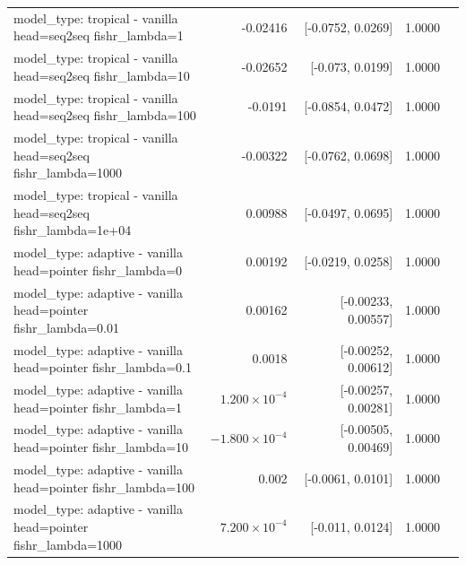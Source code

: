\documentclass[10pt]{article}
\makeatletter
\newcommand{\stackcell}[1]{\begin{tabular}[t]{@{}l@{}}#1\end{tabular}}
\makeatother
\begin{document}
{\begin{longtable}{lrrrl}
\stackcell{model\_type: tropical - vanilla\\\footnotesize head=seq2seq fishr\_lambda=1 } & -0.02416 & [-0.0752, 0.0269] & 1.0000 & \\
\stackcell{model\_type: tropical - vanilla\\\footnotesize head=seq2seq fishr\_lambda=10 } & -0.02652 & [-0.073, 0.0199] & 1.0000 & \\
\stackcell{model\_type: tropical - vanilla\\\footnotesize head=seq2seq fishr\_lambda=100 } & -0.0191 & [-0.0854, 0.0472] & 1.0000 & \\
\stackcell{model\_type: tropical - vanilla\\\footnotesize head=seq2seq fishr\_lambda=1000 } & -0.00322 & [-0.0762, 0.0698] & 1.0000 & \\
\stackcell{model\_type: tropical - vanilla\\\footnotesize head=seq2seq fishr\_lambda=1e+04 } & 0.00988 & [-0.0497, 0.0695] & 1.0000 & \\
\stackcell{model\_type: adaptive - vanilla\\\footnotesize head=pointer fishr\_lambda=0 } & 0.00192 & [-0.0219, 0.0258] & 1.0000 & \\
\stackcell{model\_type: adaptive - vanilla\\\footnotesize head=pointer fishr\_lambda=0.01 } & 0.00162 & [-0.00233, 0.00557] & 1.0000 & \\
\stackcell{model\_type: adaptive - vanilla\\\footnotesize head=pointer fishr\_lambda=0.1 } & 0.0018 & [-0.00252, 0.00612] & 1.0000 & \\
\stackcell{model\_type: adaptive - vanilla\\\footnotesize head=pointer fishr\_lambda=1 } & $1.200\times10^{-4}$ & [-0.00257, 0.00281] & 1.0000 & \\
\stackcell{model\_type: adaptive - vanilla\\\footnotesize head=pointer fishr\_lambda=10 } & $-1.800\times10^{-4}$ & [-0.00505, 0.00469] & 1.0000 & \\
\stackcell{model\_type: adaptive - vanilla\\\footnotesize head=pointer fishr\_lambda=100 } & 0.002 & [-0.0061, 0.0101] & 1.0000 & \\
\stackcell{model\_type: adaptive - vanilla\\\footnotesize head=pointer fishr\_lambda=1000 } & $7.200\times10^{-4}$ & [-0.011, 0.0124] & 1.0000 & \\

\end{longtable}}
\end{document}
